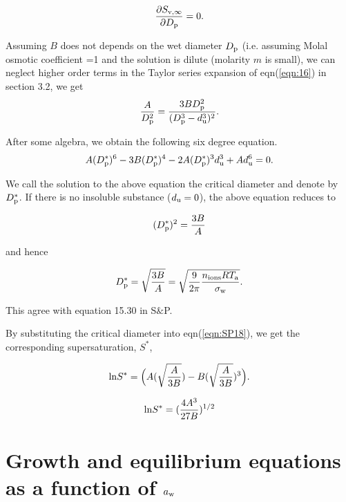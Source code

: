 \documentclass[12pt]{article}
\begin{document}
\begin{equation}\label{eqn:SP19}
\frac{\partial S_{\rm v, \infty}}{\partial D_{\rm p}}=0.
\end{equation}

Assuming $B$ does not depends on the wet diameter $D_{\rm p}$ (i.e. assuming Molal osmotic coefficient =1 and the solution is dilute (molarity $m$ is small), we can neglect higher order terms in the Taylor series expansion of eqn(\ref{eqn:16}) in section 3.2,  we get
\begin{equation}\label{eqn:SP20}
\frac{A}{D_{\rm p}^{2}}=\frac{3 B D_{\rm p}^{2}}{(D_{\rm p}^{3}- d_{\rm u}^{3})^{2}}.
\end{equation} 

After some algebra, we obtain the following six degree equation.
\begin{equation}\label{eqn:SP21}
A(D_{\rm p}^{*})^{6}-3B(D_{\rm p}^{*})^{4}-2 A(D_{\rm p}^{*})^{3} d_{\rm u}^{3}+ A d_{\rm u}^{6}=0.
\end{equation}

We call the solution to the above equation the critical diameter and denote by $D_{\rm p}^{*}$. If there is no insoluble substance ($d_{\rm u}=0$), the above equation reduces to 

\begin{equation}\label{eqn:SP22}
(D_{\rm p}^{*})^{2}=\frac{3B}{A} 
\end{equation}

and hence 

\begin{equation}\label{eqn:SP23}
D_{\rm p}^{*}=\sqrt{\frac{3B}{A}}= \sqrt {\frac{9}{2 \pi} \frac{n_{\rm ions} RT_{\rm a}}{\sigma_{\rm w}}}.
\end{equation}

This agree with equation 15.30 in S$\&$P.

By substituting the critical diameter into eqn(\ref{eqn:SP18}), we get the corresponding supersaturation, $S^{*}$,

\begin{equation}\label{eqn:SP24}
{\rm ln} S^{*} = \Big(A (\sqrt{\frac{A}{3B}})   -   B (\sqrt{\frac{A}{3B}}) ^{3} \Big).
\end{equation}


\begin{equation}\label{eqn:SP25}
{\rm ln}  S^{*}=(\frac{4A^{3}}{27B})^{1/2}
\end{equation}


\section{Growth and equilibrium equations as a function of $a_{\rm w}$} 
\end{document}
